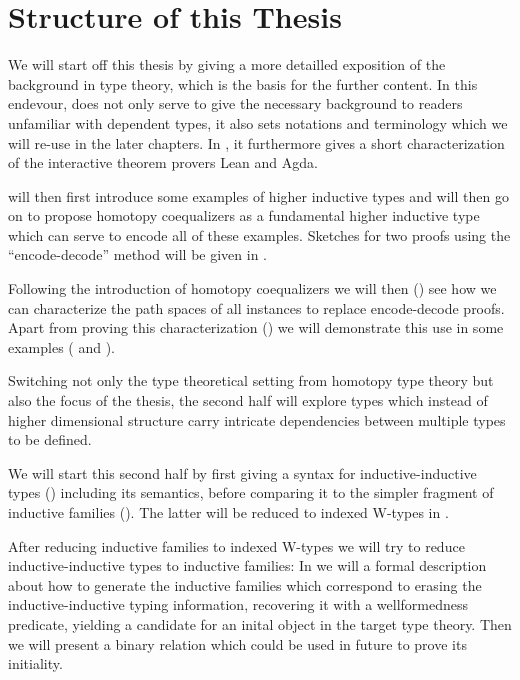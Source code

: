 \section{Structure of this Thesis}

We will start off this thesis by giving a more detailled exposition of the
background in type theory, which is the basis for the further content.
In this endevour,  does not only serve to give the necessary background
to readers unfamiliar with dependent types, it also sets notations and terminology
which we will re-use in the later chapters.
In , it furthermore gives a short characterization of the interactive
theorem provers Lean and Agda.

 will then first introduce some examples of higher inductive types
and will then go on to propose homotopy coequalizers as a fundamental higher
inductive type which can serve to encode all of these examples.
Sketches for two proofs using the ``encode-decode'' method will be given in
.

Following the introduction of homotopy coequalizers we will then ()
see how we can
characterize the path spaces of all instances to replace encode-decode proofs.
Apart from proving this characterization ()
we will demonstrate this use in some examples (
and ).

Switching not only the type theoretical setting from homotopy type theory
but also the focus of the thesis, the second half will explore types which
instead of higher dimensional structure carry intricate dependencies between
multiple types to be defined.

We will start this second half by first giving a syntax for inductive-inductive
types () including its semantics,
before comparing it to the simpler fragment of inductive families ().
The latter will be reduced to indexed W-types in .

After reducing inductive families to indexed W-types we will try to reduce
inductive-inductive types to inductive families:
In  we will a formal description about how to generate the
inductive families which correspond to
erasing the inductive-inductive typing information,
recovering it with a wellformedness predicate, yielding a candidate for an inital
object in the target type theory.
Then we will present a binary relation which could be used in future to prove
its initiality.










